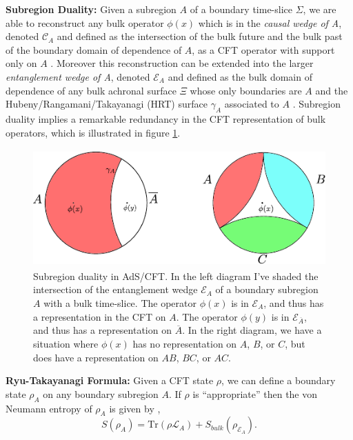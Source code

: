 \documentclass[12pt]{article}
\newcommand{\be}{\begin{equation}}
\newcommand{\ee}{\end{equation}}
\newcommand{\bfig}{\begin{figure}\begin{center}}
\newcommand{\efig}{\end{center}\end{figure}}
\newcommand{\Tr}{\mathrm{Tr}}
\newcommand{\Ll}{\mathcal{L}}
\newcommand{\LA}{\Ll_A}
\newcommand{\ol}{\overline}
\newcommand{\EA}{\mathcal{E}_A}
\begin{document}
\item\textbf{Subregion Duality:} Given a subregion $A$ of a boundary time-slice $\Sigma$, we are able to reconstruct any bulk operator $\phi(x)$ which is in the \textit{causal wedge of A}, denoted $\mathcal{C}_A$ and defined as the intersection of the bulk future and the bulk past of the boundary domain of dependence of $A$, as a CFT operator with support only on $A$ \cite{Hamilton:2006az,Morrison:2014jha,Bousso:2012sj,Czech:2012bh,Bousso:2012mh,Hubeny:2012wa}.  Moreover this reconstruction can be extended  \cite{Czech:2012bh,Wall:2012uf,Headrick:2014cta,Jafferis:2015del,Dong:2016eik} into the larger \textit{entanglement wedge of A}, denoted $\mathcal{E}_A$ and defined as the bulk domain of dependence of any bulk achronal surface $\Xi$ whose only boundaries are $A$ and the Hubeny/Rangamani/Takayanagi (HRT) surface $\gamma_A$ associated to $A$ \cite{Hubeny:2007xt}.  Subregion duality implies a remarkable redundancy in the CFT representation of bulk operators, which is illustrated in figure \ref{subregions}.
\bfig
\includegraphics[height=4.5cm]{subregions-1.pdf}
\caption{Subregion duality in AdS/CFT.  In the left diagram I've shaded the intersection of the entanglement wedge $\EA$ of a boundary subregion $A$ with a bulk time-slice.  The operator $\phi(x)$ is in $\EA$, and thus has a representation in the CFT on $A$. The operator $\phi(y)$ is in $\mathcal{E}_{\ol{A}}$, and thus has a representation on $\ol{A}$.  In the right diagram, we have a situation where $\phi(x)$ has no representation on $A$, $B$, or $C$, but does have a representation on $AB$, $BC$, or $AC$.}\label{subregions}
\efig
\item\textbf{Ryu-Takayanagi Formula:} Given a CFT state $\rho$, we can define a boundary state $\rho_A$ on any boundary subregion $A$.  If $\rho$ is ``appropriate'' then the von Neumann entropy of $\rho_A$ is given by \cite{Ryu:2006bv}, \cite{Hubeny:2007xt,Lewkowycz:2013nqa,Barrella:2013wja,Faulkner:2013ana}
\be\label{flm}
S(\rho_A)=\Tr \left(\rho \LA \right)+S_{bulk}(\rho_{\EA}).
\ee
\end{document}
